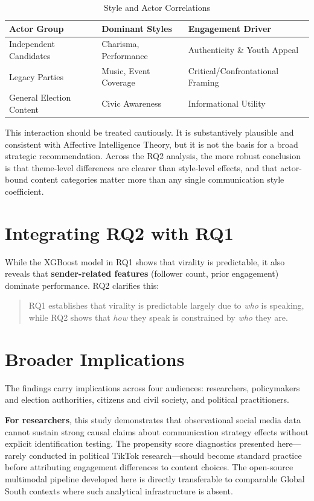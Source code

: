 \documentclass[12pt,a4paper]{report}
\begin{document}
\begin{table}[h!]
\centering
\caption{Style and Actor Correlations}
\begin{tabular}{@{}lll@{}}
\toprule
\textbf{Actor Group} & \textbf{Dominant Styles} & \textbf{Engagement Driver} \\ \bottomrule
Independent Candidates & Charisma, Performance & Authenticity \& Youth Appeal \\
Legacy Parties & Music, Event Coverage & Critical/Confrontational Framing \\
General Election Content & Civic Awareness & Informational Utility \\ \bottomrule
\end{tabular}
\end{table}
\newpage
This interaction should be treated cautiously. It is substantively plausible and consistent with Affective Intelligence Theory, but it is not the basis for a broad strategic recommendation. Across the RQ2 analysis, the more robust conclusion is that theme-level differences are clearer than style-level effects, and that actor-bound content categories matter more than any single communication style coefficient.

\section{Integrating RQ2 with RQ1}
While the XGBoost model in RQ1 shows that virality is predictable, it also reveals that \textbf{sender-related features} (follower count, prior engagement) dominate performance. RQ2 clarifies this: 
\begin{quote}
RQ1 establishes that virality is predictable largely due to \textit{who} is speaking, while RQ2 shows that \textit{how} they speak is constrained by \textit{who} they are.
\end{quote}

\section{Broader Implications}

The findings carry implications across four audiences: researchers, policymakers and election authorities, citizens and civil society, and political practitioners.

\textbf{For researchers}, this study demonstrates that observational social media data cannot sustain strong causal claims about communication strategy effects without explicit identification testing. The propensity score diagnostics presented here---rarely conducted in political TikTok research---should become standard practice before attributing engagement differences to content choices. The open-source multimodal pipeline developed here is directly transferable to comparable Global South contexts where such analytical infrastructure is absent.
\end{document}
